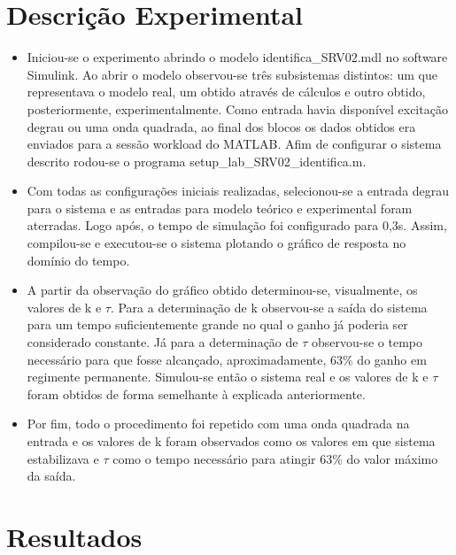 \documentclass[a4paper,11pt]{article}
\begin{document}
\section{Descrição Experimental}
\begin{itemize}
 \item
Iniciou-se o experimento abrindo o modelo identifica\_SRV02.mdl 
no software Simulink. Ao abrir o modelo observou-se três subsistemas 
distintos: um que representava o modelo real, um obtido através de 
cálculos e outro obtido, posteriormente, experimentalmente. Como 
entrada havia disponível excitação degrau ou uma onda quadrada, ao 
final dos blocos os dados obtidos era enviados para a sessão workload 
do MATLAB. Afim de configurar o sistema descrito rodou-se o programa 
setup\_lab\_SRV02\_identifica.m.

\item
Com todas as configurações iniciais realizadas, selecionou-se a 
entrada degrau para o sistema e as entradas para modelo teórico e 
experimental foram aterradas. Logo após, o tempo de simulação foi 
configurado para 0,3s. Assim, compilou-se e executou-se o sistema 
plotando o gráfico de resposta no domínio do tempo.

\item
A partir da observação do gráfico obtido determinou-se, visualmente, 
os valores de k e $\tau$. Para a determinação de k observou-se a 
saída do sistema para um tempo suficientemente grande no qual o ganho 
já poderia ser considerado constante. Já para a determinação de 
$\tau$ observou-se o tempo necessário para que fosse alcançado, 
aproximadamente, 63\% do ganho em regimente permanente.
Simulou-se então o sistema real e os valores de k e $\tau$ foram 
obtidos de 
forma semelhante à explicada anteriormente.

\item
Por fim, todo o procedimento foi repetido com uma onda 
quadrada na entrada e os valores de k foram observados como os valores 
em que sistema estabilizava e $\tau$ como o tempo necessário para 
atingir 63\% do valor máximo da saída.
\end{itemize}
\section{Resultados}
\end{document}
